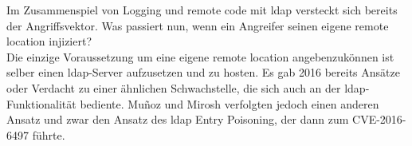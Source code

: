 Im Zusammenspiel von Logging und remote code mit ldap versteckt sich bereits der Angriffsvektor. Was passiert nun, wenn ein Angreifer
seinen eigene remote location injiziert?\\
Die einzige Voraussetzung um eine eigene remote location angebenzukönnen ist selber einen \gls{ldap}-Server aufzusetzen und zu hosten. Es gab 2016 bereits Ansätze
oder Verdacht zu einer ähnlichen Schwachstelle, die sich auch an der \gls{ldap}-Funktionalität bediente. Muñoz und Mirosh verfolgten jedoch einen anderen Ansatz und zwar den Ansatz des \gls{ldap} Entry Poisoning,
der dann zum CVE-2016-6497 führte.
